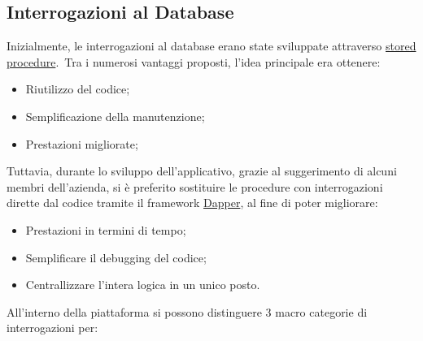 \subsection{Interrogazioni al Database}
Inizialmente, le interrogazioni al database erano state sviluppate attraverso
\href{https://learn.microsoft.com/it-it/sql/relational-databases/stored-procedures/stored-procedures-database-engine?view=sql-server-ver16}{stored
	procedure}.\ Tra i numerosi vantaggi proposti, l'idea principale era ottenere:
\begin{itemize}
	\item Riutilizzo del codice;
	\item Semplificazione della manutenzione;
	\item Prestazioni migliorate;
\end{itemize}
Tuttavia, durante lo sviluppo dell'applicativo, grazie al suggerimento di alcuni membri
dell'azienda, si è preferito sostituire le procedure con interrogazioni dirette dal codice
tramite il framework \href{https://learn.microsoft.com/it-it/azure/azure-sql/database/elastic-scale-working-with-dapper?view=azuresql}{Dapper}, al fine di poter migliorare:
\begin{itemize}
	\item Prestazioni in termini di tempo;
	\item Semplificare il debugging del codice;
	\item Centrallizzare l'intera logica in un unico posto.
\end{itemize}
All'interno della piattaforma si possono distinguere 3 macro categorie di interrogazioni per:
